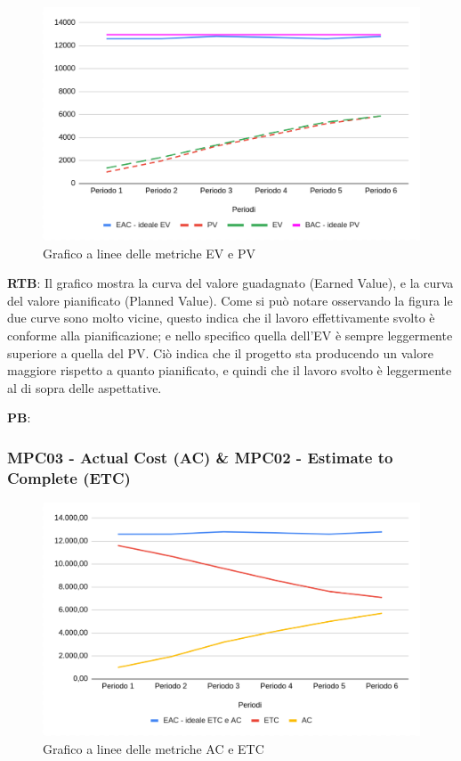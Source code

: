 \documentclass[10pt]{article}
\begin{document}
\begin{justify}
\begin{figure}[H]
  \centering
  \includegraphics[width=0.9\linewidth]{EV-PV.png}
  \caption{Grafico a linee delle metriche EV e PV}
  \label{fig:EV-PVchart}
\end{figure}

\textbf{RTB}: Il grafico mostra la curva del valore guadagnato (Earned Value), e la curva del valore pianificato (Planned Value). Come si può notare osservando la 
figura le due curve sono molto vicine, questo indica che il lavoro effettivamente svolto è conforme alla pianificazione; e nello specifico quella dell'EV è sempre 
leggermente superiore a quella del PV. Ciò indica che il progetto sta producendo un valore maggiore rispetto a quanto pianificato, e quindi che il lavoro svolto 
è leggermente al di sopra delle aspettative.

\noindent
\textbf{PB}:


\subsubsection{MPC03 - Actual Cost (AC) \& MPC02 - Estimate to Complete (ETC)}%

\begin{figure}[H]
  \centering
  \includegraphics[width=0.9\linewidth]{AC-ETC.png}
  \caption{Grafico a linee delle metriche AC e ETC}
  \label{fig:AC-ETCchart}
\end{figure}


\end{justify}
\end{document}
